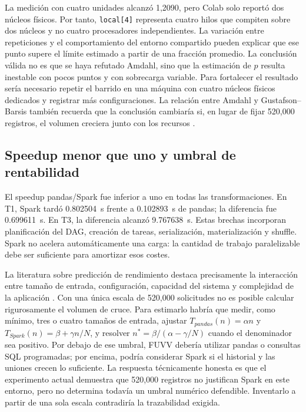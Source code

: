 \documentclass[11pt,a4paper]{article}
\begin{document}
La medición con cuatro unidades alcanzó 1,2090, pero Colab solo reportó dos núcleos físicos. Por tanto, \texttt{local[4]} representa cuatro hilos que compiten sobre dos núcleos y no cuatro procesadores independientes. La variación entre repeticiones y el comportamiento del entorno compartido pueden explicar que ese punto supere el límite estimado a partir de una fracción promedio. La conclusión válida no es que se haya refutado Amdahl, sino que la estimación de $p$ resulta inestable con pocos puntos y con sobrecarga variable. Para fortalecer el resultado sería necesario repetir el barrido en una máquina con cuatro núcleos físicos dedicados y registrar más configuraciones. La relación entre Amdahl y Gustafson--Barsis también recuerda que la conclusión cambiaría si, en lugar de fijar 520,000 registros, el volumen creciera junto con los recursos \cite{karbowski2025}.

\subsection{Speedup menor que uno y umbral de rentabilidad}
El speedup pandas/Spark fue inferior a uno en todas las transformaciones. En T1, Spark tardó \SI{0.802504}{\second} frente a \SI{0.102893}{\second} de pandas; la diferencia fue \SI{0.699611}{\second}. En T3, la diferencia alcanzó \SI{9.767638}{\second}. Estas brechas incorporan planificación del DAG, creación de tareas, serialización, materialización y shuffle. Spark no acelera automáticamente una carga: la cantidad de trabajo paralelizable debe ser suficiente para amortizar esos costes.

La literatura sobre predicción de rendimiento destaca precisamente la interacción entre tamaño de entrada, configuración, capacidad del sistema y complejidad de la aplicación \cite{shen2023spark}. Con una única escala de 520,000 solicitudes no es posible calcular rigurosamente el volumen de cruce. Para estimarlo habría que medir, como mínimo, tres o cuatro tamaños de entrada, ajustar $T_{pandas}(n)=\alpha n$ y $T_{Spark}(n)=\beta+\gamma n/N$, y resolver $n^*=\beta/(\alpha-\gamma/N)$ cuando el denominador sea positivo. Por debajo de ese umbral, FUVV debería utilizar pandas o consultas SQL programadas; por encima, podría considerar Spark si el historial y las uniones crecen lo suficiente. La respuesta técnicamente honesta es que el experimento actual demuestra que 520,000 registros no justifican Spark en este entorno, pero no determina todavía un umbral numérico defendible. Inventarlo a partir de una sola escala contradiría la trazabilidad exigida.
\end{document}
